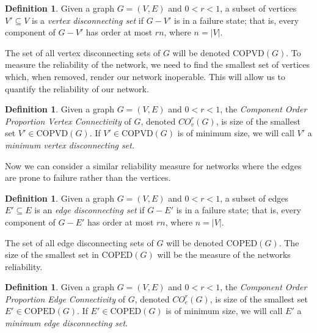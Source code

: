 \documentclass[12pt]{article}
\theoremstyle{definition}
\newtheorem{definition}[theorem]{Definition}
\newcommand{\COVDS}{\text{COPVD}}
\newcommand{\COEDS}{\text{COPED}}
\newcommand{\COV}[2]{CO^{#1}_{v}(#2)}
\newcommand{\COE}[2]{CO^{#1}_{e}(#2)}
\begin{document}
\begin{definition} 
Given a graph $G=(V,E)$ and $0<r<1$, a subset of vertices $V' \subseteq V$ is a \textit{vertex disconnecting set} if $G-V'$ is in a failure state; that is, every component of $G-V'$ has order at most $rn$, where $n = |V|$. 
\end{definition}

 The set of all vertex disconnecting sets of $G$ will be denoted $\COVDS(G)$. To measure the reliability of the network, we need to find the smallest set of vertices which, when removed, render our network inoperable. This will allow us to quantify the reliability of our network. 

\begin{definition}
Given a graph $G=(V,E)$ and $0<r<1$, the \textit{Component Order Proportion Vertex Connectivity} of $G$, denoted $\COV{r}{G}$, is size of the smallest set $V' \in \COVDS(G)$. If $V' \in \COVDS(G)$ is of minimum size, we will call $V'$ a \textit{minimum vertex disconnecting set.} 
\end{definition}

Now we can consider a similar reliability measure for networks where the edges are prone to failure rather than the vertices. 

\begin{definition} 
Given a graph $G=(V, E)$ and $0<r<1$, a subset of edges $E' \subseteq E$ is an \textit{edge disconnecting set} if $G-E'$ is in a failure state; that is, every component of $G-E'$ has order at most $rn$, where $n = |V|$. 
\end{definition}

The set of all edge disconnecting sets of $G$ will be denoted $\COEDS(G)$. The size of the smallest set in $\COEDS(G)$ will be the measure of the networks reliability. 

\begin{definition}
Given a graph $G=(V,E)$ and $0<r<1$, the \textit{Component Order Proportion Edge Connectivity} of $G$, denoted $\COE{r}{G}$, is size of the smallest set $E' \in \COEDS(G)$. If $E' \in \COEDS(G)$ is of minimum size, we will call $E'$ a \textit{minimum edge disconnecting set}. 
\end{definition}



\end{document}

